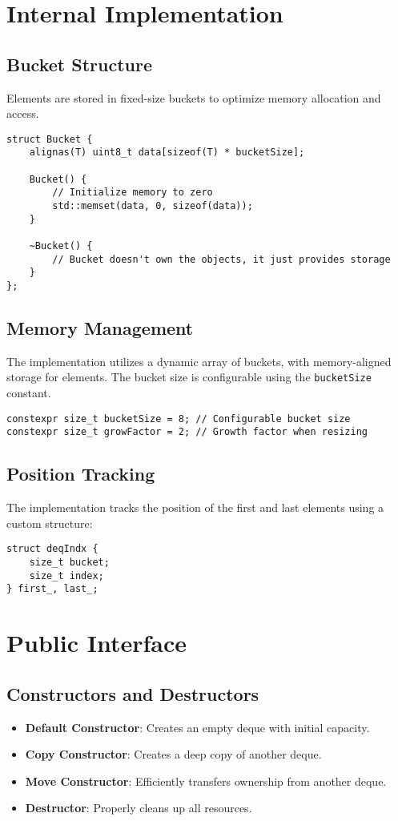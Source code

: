 \documentclass[a4paper,12pt]{article}
\begin{document}
\section{Internal Implementation}

\subsection{Bucket Structure}
Elements are stored in fixed-size buckets to optimize memory allocation and access.

\begin{lstlisting}
struct Bucket {
    alignas(T) uint8_t data[sizeof(T) * bucketSize];
    
    Bucket() {
        // Initialize memory to zero
        std::memset(data, 0, sizeof(data));
    }
    
    ~Bucket() {
        // Bucket doesn't own the objects, it just provides storage
    }
};
\end{lstlisting}

\subsection{Memory Management}
The implementation utilizes a dynamic array of buckets, with memory-aligned storage for elements. The bucket size is configurable using the \texttt{bucketSize} constant.

\begin{lstlisting}
constexpr size_t bucketSize = 8; // Configurable bucket size
constexpr size_t growFactor = 2; // Growth factor when resizing
\end{lstlisting}

\subsection{Position Tracking}
The implementation tracks the position of the first and last elements using a custom structure:

\begin{lstlisting}
struct deqIndx {
    size_t bucket;
    size_t index;
} first_, last_;
\end{lstlisting}

\section{Public Interface}

\subsection{Constructors and Destructors}
\begin{itemize}
    \item \textbf{Default Constructor}: Creates an empty deque with initial capacity.
    \item \textbf{Copy Constructor}: Creates a deep copy of another deque.
    \item \textbf{Move Constructor}: Efficiently transfers ownership from another deque.
    \item \textbf{Destructor}: Properly cleans up all resources.
\end{itemize}
\end{document}
